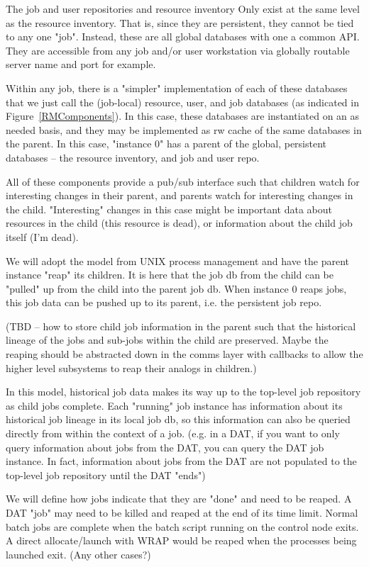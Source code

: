 The job and user repositories and resource inventory Only exist
at the same level as the resource inventory. That is, since they
are persistent, they cannot be tied to any one "job". Instead,
these are all global databases with one a common API.  They are
accessible from any job and/or user workstation via globally
routable server name and port for example.

Within any job, there is a "simpler" implementation of each of these
databases that we just call the (job-local) resource, user, and job
databases (as indicated in Figure~\ref{RMComponents}).  In this case,
these databases are instantiated on an as needed basis, and they may
be implemented as rw cache of the same databases in the parent. In
this case, "instance 0" has a parent of the global, persistent
databases -- the resource inventory, and job and user repo.

All of these components provide a pub/sub interface such that children
watch for interesting changes in their parent, and parents watch for
interesting changes in the child. "Interesting" changes in this case
might be important data about resources in the child (this resource is
dead), or information about the child job itself (I'm dead).

We will adopt the model from UNIX process management and have the
parent instance "reap" its children. It is here that the job db from
the child can be "pulled" up from the child into the parent job db.
When instance 0 reaps jobs, this job data can be pushed up to its
parent, i.e. the persistent job repo.

(TBD -- how to store child job information in the parent such that the
historical lineage of the jobs and sub-jobs within the child are
preserved.  Maybe the reaping should be abstracted down in the comms
layer with callbacks to allow the higher level subsystems to reap
their analogs in children.)

In this model, historical job data makes its way up to the top-level
job repository as child jobs complete. Each "running" job instance has
information about its historical job lineage in its local job db, so
this information can also be queried directly from within the context
of a job. (e.g. in a DAT, if you want to only query information about
jobs from the DAT, you can query the DAT job instance. In fact,
information about jobs from the DAT are not populated to the top-level
job repository until the DAT "ends")

We will define how jobs indicate that they are "done" and need to be
reaped. A DAT "job" may need to be killed and reaped at the end of its
time limit. Normal batch jobs are complete when the batch script
running on the control node exits. A direct allocate/launch with WRAP
would be reaped when the processes being launched exit. (Any other
cases?)

